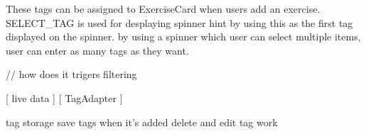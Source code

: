 These tags can be assigned to ExerciseCard when users add an exercise. 
SELECT_TAG is used for desplaying spinner hint by using this as the first tag displayed on the spinner.
by using a spinner which user can select multiple items, user can enter as many tags as they want.


// how does it trigers filtering

[ live data ]
[ TagAdapter ]

\model
tag storage
save tags when it's added
delete and edit tag work







